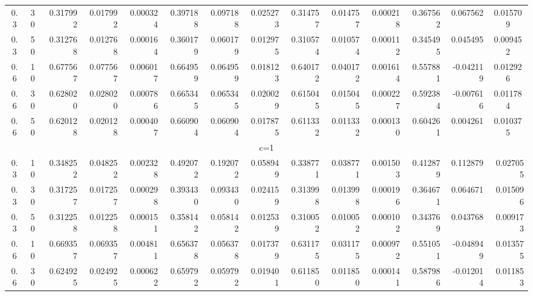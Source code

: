 \documentclass[11pt,a4paper]{article}
\numberwithin{equation}{section}
\begin{document}
\begin{landscape}
\begin{table}[htbp]
\begin{tabular}{cc|rrr|rrr|rrr|rrr}
				0.3   & 30    & 0.317992 & 0.017992 & 0.000324 & 0.397188 & 0.097188 & 0.025273 & 0.314757 & 0.014757 & 0.000218 & 0.367562 & 0.067562 & \multicolumn{1}{c}{0.015709} \\

				0.3   & 50    & 0.312768 & 0.012768 & 0.000164 & 0.360179 & 0.060179 & 0.012975 & 0.310574 & 0.010574 & 0.000112 & 0.345495 & 0.045495 & \multicolumn{1}{c}{0.009452} \\

				0.6   & 10    & 0.677567 & 0.077567 & 0.006017 & 0.664959 & 0.064959 & 0.018123 & 0.640172 & 0.040172 & 0.001614 & 0.557881 & -0.042119 & \multicolumn{1}{c}{0.012926} \\

				0.6   & 30    & 0.628020 & 0.028020 & 0.000786 & 0.665345 & 0.065345 & 0.020029 & 0.615045 & 0.015045 & 0.000227 & 0.592384 & -0.007616 & \multicolumn{1}{c}{0.011784} \\

				0.6   & 50    & 0.620128 & 0.020128 & 0.000407 & 0.660904 & 0.060904 & 0.017875 & 0.611332 & 0.011332 & 0.000130 & 0.604261 & 0.004261 & \multicolumn{1}{c}{0.010375} \\

				\midrule

				\multicolumn{14}{c}{                                      c=1} \\

				\midrule

				0.3   & 10    & 0.348252 & 0.048252 & 0.002328 & 0.492072 & 0.192072 & 0.058949 & 0.338771 & 0.038771 & 0.001503 & 0.412879 & 0.112879 & 0.027055 \\

				0.3   & 30    & 0.317257 & 0.017257 & 0.000298 & 0.393430 & 0.093430 & 0.024159 & 0.313998 & 0.013998 & 0.000196 & 0.364671 & 0.064671 & 0.015096 \\

				0.3   & 50    & 0.312258 & 0.012258 & 0.000151 & 0.358142 & 0.058142 & 0.012539 & 0.310052 & 0.010052 & 0.000102 & 0.343769 & 0.043768 & 0.009173 \\

				0.6   & 10    & 0.669357 & 0.069357 & 0.004811 & 0.656378 & 0.056378 & 0.017379 & 0.631175 & 0.031175 & 0.000972 & 0.551051 & -0.048949 & 0.013575 \\

				0.6   & 30    & 0.624925 & 0.024925 & 0.000622 & 0.659792 & 0.059792 & 0.019401 & 0.611850 & 0.011850 & 0.000141 & 0.587986 & -0.012014 & 0.011853 \\


\end{tabular}
\end{table}
\end{landscape}
\end{document}
